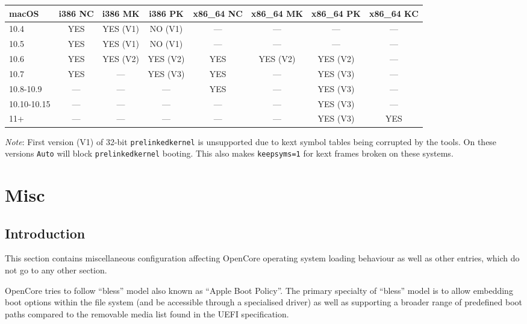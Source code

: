 \documentclass[]{article}
\begin{document}
\begin{enumerate}
  \begin{center}
  \begin{tabular}{|p{0.67in}|c|c|c|c|c|c|c|}
  \hline
  \textbf{macOS} & \textbf{i386 NC} & \textbf{i386 MK} & \textbf{i386 PK} & \textbf{x86\_64 NC} & \textbf{x86\_64 MK} & \textbf{x86\_64 PK} & \textbf{x86\_64 KC} \\
  \hline
  10.4 & YES & YES (V1) & NO (V1) & --- & --- & --- & --- \\
  \hline
  10.5 & YES & YES (V1) & NO (V1) & --- & --- & --- & --- \\
  \hline
  10.6 & YES & YES (V2) & YES (V2) & YES & YES (V2) & YES (V2) & --- \\
  \hline
  10.7 & YES & --- & YES (V3) & YES & --- & YES (V3) & --- \\
  \hline
  10.8-10.9 & --- & --- & --- & YES & --- & YES (V3) & --- \\
  \hline
  10.10-10.15 & --- & --- & --- & --- & --- & YES (V3) & --- \\
  \hline
  11+ & --- & --- & --- & --- & --- & YES (V3) & YES \\
  \hline
  \end{tabular}
  \end{center}

  \emph{Note}: First version (V1) of 32-bit \texttt{prelinkedkernel} is unsupported
  due to kext symbol tables being corrupted by the tools. On these versions \texttt{Auto}
  will block \texttt{prelinkedkernel} booting. This also makes \texttt{keepsyms=1} for kext frames
  broken on these systems.

\end{enumerate}


\section{Misc}\label{misc}

\subsection{Introduction}\label{miscintro}

This section contains miscellaneous configuration affecting OpenCore operating system loading behaviour
as well as other entries, which do not go to any other section.

OpenCore tries to follow ``bless'' model also known as ``Apple Boot Policy''. The primary specialty of
``bless'' model is to allow embedding boot options within the file system (and be accessible through a
specialised driver) as well as supporting a broader range of predefined boot paths compared to the
removable media list found in the UEFI specification.
\end{document}
